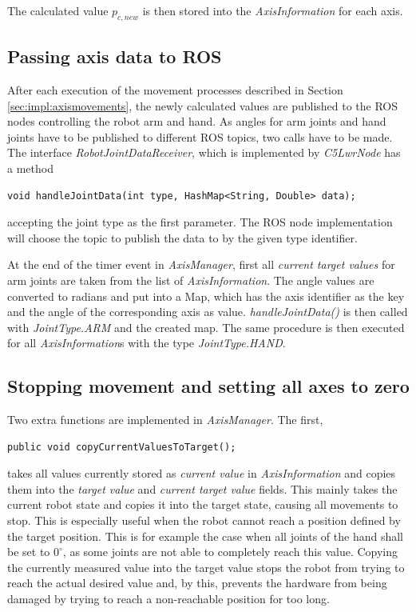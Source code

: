 The calculated value $p_{c,new}$ is then stored into the \textit{AxisInformation} for each axis.

\subsection{Passing axis data to ROS}
\label{sec:impl:aximgrros}

After each execution of the movement processes described in Section \ref{sec:impl:axismovements}, the newly calculated values are published to the ROS nodes controlling the robot arm and hand. As angles for arm joints and hand joints have to be published to different ROS topics, two calls have to be made. The interface \textit{RobotJointDataReceiver}, which is implemented by \textit{C5LwrNode} has a method
\begin{lstlisting}
void handleJointData(int type, HashMap<String, Double> data);
\end{lstlisting}
accepting the joint type as the first parameter. The ROS node implementation will choose the topic to publish the data to by the given type identifier.

At the end of the timer event in \textit{AxisManager}, first all \textit{current target values} for arm joints are taken from the list of \textit{AxisInformation}. The angle values are converted to radians and put into a Map, which has the axis identifier as the key and the angle of the corresponding axis as value. \textit{handleJointData()} is then called with \textit{JointType.ARM} and the created map. The same procedure is then executed for all \textit{AxisInformation}s with the type \textit{JointType.HAND}.

\subsection{Stopping movement and setting all axes to zero}

Two extra functions are implemented in \textit{AxisManager}. The first,
\begin{lstlisting}
public void copyCurrentValuesToTarget();
\end{lstlisting}
takes all values currently stored as \textit{current value} in \textit{AxisInformation} and copies them into the \textit{target value} and \textit{current target value} fields. This mainly takes the current robot state and copies it into the target state, causing all movements to stop. This is especially useful when the robot cannot reach a position defined by the target position. This is for example the case when all joints of the hand shall be set to $0^\circ$, as some joints are not able to completely reach this value. Copying the currently measured value into the target value stops the robot from trying to reach the actual desired value and, by this, prevents the hardware from being damaged by trying to reach a non-reachable position for too long.

